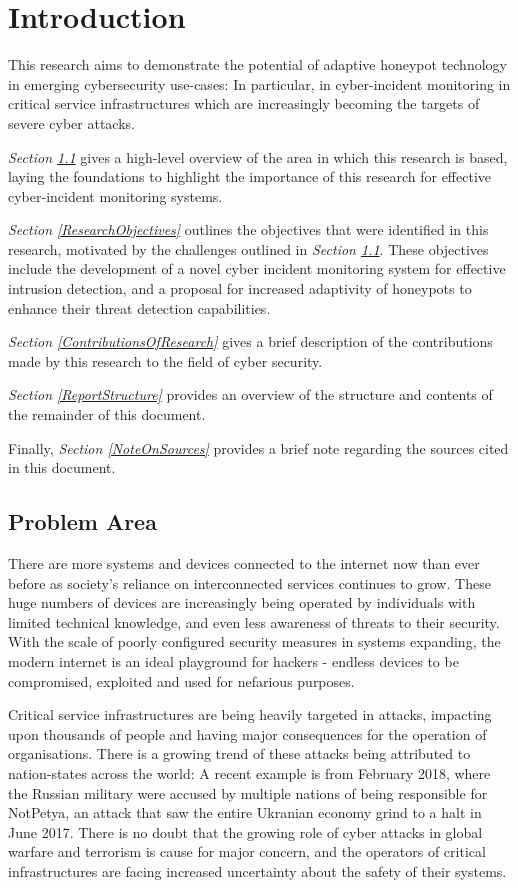 \chapter{Introduction}

This research aims to demonstrate the potential of adaptive honeypot technology in emerging cybersecurity use-cases: In particular, in cyber-incident monitoring in critical service infrastructures which are increasingly becoming the targets of severe cyber attacks. 

\textit{Section \ref{ProblemArea}} gives a high-level overview of the area in which this research is based, laying the foundations to highlight the importance of this research for effective cyber-incident monitoring systems. 

\textit{Section \ref{ResearchObjectives}} outlines the objectives that were identified in this research, motivated by the challenges outlined in \textit{Section \ref{ProblemArea}}. These objectives include the development of a novel cyber incident monitoring system for effective intrusion detection, and a proposal for increased adaptivity of honeypots to enhance their threat detection capabilities. 

\textit{Section \ref{ContributionsOfResearch}} gives a brief description of the contributions made by this research to the field of cyber security.

\textit{Section \ref{ReportStructure}} provides an overview of the structure and contents of the remainder of this document.

Finally, \textit{Section \ref{NoteOnSources}} provides a brief note regarding the sources cited in this document.


\section{Problem Area} \label{ProblemArea}

There are more systems and devices connected to the internet now than ever before as society's reliance on interconnected services continues to grow. These huge numbers of devices are increasingly being operated by individuals with limited technical knowledge, and even less awareness of threats to their security. With the scale of poorly configured security measures in systems expanding, the modern internet is an ideal playground for hackers - endless devices to be compromised, exploited and used for nefarious purposes.

Critical service infrastructures are being heavily targeted in attacks, impacting upon thousands of people and having major consequences for the operation of organisations. There is a growing trend of these attacks being attributed to nation-states across the world: A recent example is from February 2018, where the Russian military were accused by multiple nations of being responsible for NotPetya, an attack that saw the entire Ukranian economy grind to a halt in June 2017. \cite{NCSCBlamesRussiaForWannacry} There is no doubt that the growing role of cyber attacks in global warfare and terrorism is cause for major concern, and the operators of critical infrastructures are facing increased uncertainty about the safety of their systems. 

